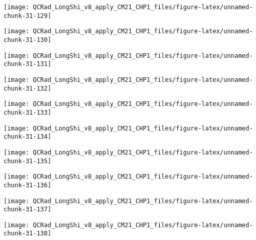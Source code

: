\documentclass[
  10pt,
  a4paper,oneside]{article}
\begin{document}
\begin{center}\texttt{[image: QCRad\_LongShi\_v8\_apply\_CM21\_CHP1\_files/figure-latex/unnamed-chunk-31-129]} \end{center}

\begin{center}\texttt{[image: QCRad\_LongShi\_v8\_apply\_CM21\_CHP1\_files/figure-latex/unnamed-chunk-31-130]} \end{center}

\begin{center}\texttt{[image: QCRad\_LongShi\_v8\_apply\_CM21\_CHP1\_files/figure-latex/unnamed-chunk-31-131]} \end{center}

\begin{center}\texttt{[image: QCRad\_LongShi\_v8\_apply\_CM21\_CHP1\_files/figure-latex/unnamed-chunk-31-132]} \end{center}

\begin{center}\texttt{[image: QCRad\_LongShi\_v8\_apply\_CM21\_CHP1\_files/figure-latex/unnamed-chunk-31-133]} \end{center}

\begin{center}\texttt{[image: QCRad\_LongShi\_v8\_apply\_CM21\_CHP1\_files/figure-latex/unnamed-chunk-31-134]} \end{center}

\begin{center}\texttt{[image: QCRad\_LongShi\_v8\_apply\_CM21\_CHP1\_files/figure-latex/unnamed-chunk-31-135]} \end{center}

\begin{center}\texttt{[image: QCRad\_LongShi\_v8\_apply\_CM21\_CHP1\_files/figure-latex/unnamed-chunk-31-136]} \end{center}

\begin{center}\texttt{[image: QCRad\_LongShi\_v8\_apply\_CM21\_CHP1\_files/figure-latex/unnamed-chunk-31-137]} \end{center}

\begin{center}\texttt{[image: QCRad\_LongShi\_v8\_apply\_CM21\_CHP1\_files/figure-latex/unnamed-chunk-31-138]} \end{center}
\end{document}
